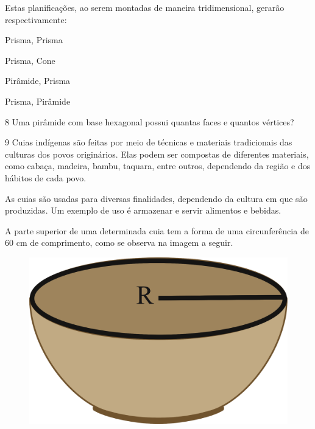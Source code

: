 Estas planificações, ao serem montadas de maneira tridimensional,
gerarão respectivamente:

\begin{minipage}{.5\textwidth}
\begin{escolha}
  \item Prisma, Prisma

  \item Prisma, Cone

  \item Pirâmide, Prisma

  \item Prisma, Pirâmide
\end{escolha}
\end{minipage}

\num{8} Uma pirâmide com base hexagonal possui quantas faces e quantos
vértices?

\begin{emptybox}
\end{emptybox}

\num{9} Cuias indígenas são feitas por meio de técnicas e materiais tradicionais 
das culturas dos povos originários. Elas podem ser compostas de diferentes
materiais, como cabaça, madeira, bambu, taquara, entre outros, dependendo da
região e dos hábitos de cada povo.

As cuias são usadas para diversas finalidades, dependendo da
cultura em que são produzidas. Um exemplo de uso é armazenar e servir
alimentos e bebidas.

A parte superior de uma determinada cuia tem a forma de uma
circunferência de 60 cm de comprimento, como se observa na imagem a seguir.

\begin{figure}[htpb!]
\centering
\includegraphics[width=.5\textwidth]{./ilustras-mat/modulo_10-atividade_9.png}
\end{figure}

